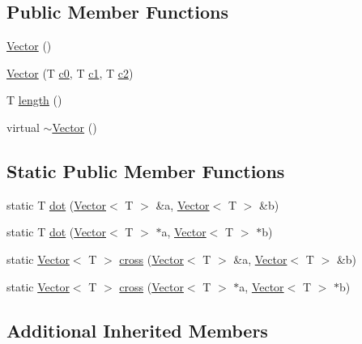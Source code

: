 \subsection*{Public Member Functions}
\begin{DoxyCompactItemize}
\item 
\hyperlink{classccmc_1_1_vector_af4225e7206c28bacb630cb396c64be26}{Vector} ()
\item 
\hyperlink{classccmc_1_1_vector_a02455eac25051ae838ad4e95e7216714}{Vector} (T \hyperlink{classccmc_1_1_point_a89fbc3792873bbc1b35d205fc0b56112}{c0}, T \hyperlink{classccmc_1_1_point_af305f62b5b3830dfb9659ba05fa8730b}{c1}, T \hyperlink{classccmc_1_1_point_aca8161451d99e44ad32f735265273db6}{c2})
\item 
T \hyperlink{classccmc_1_1_vector_a9e0862cc9c8815c93f956ccc9e23fd2f}{length} ()
\item 
virtual \hyperlink{classccmc_1_1_vector_a4ebb935d3f42494678f37eda85a06c1a}{$\sim$\-Vector} ()
\end{DoxyCompactItemize}
\subsection*{Static Public Member Functions}
\begin{DoxyCompactItemize}
\item 
static T \hyperlink{classccmc_1_1_vector_a9f03423f6c4bc0ccecc1fff2f7ca79a2}{dot} (\hyperlink{classccmc_1_1_vector}{Vector}$<$ T $>$ \&a, \hyperlink{classccmc_1_1_vector}{Vector}$<$ T $>$ \&b)
\item 
static T \hyperlink{classccmc_1_1_vector_a6071878bac8259f1794aa9109ae9431b}{dot} (\hyperlink{classccmc_1_1_vector}{Vector}$<$ T $>$ $\ast$a, \hyperlink{classccmc_1_1_vector}{Vector}$<$ T $>$ $\ast$b)
\item 
static \hyperlink{classccmc_1_1_vector}{Vector}$<$ T $>$ \hyperlink{classccmc_1_1_vector_a554c29dfc55fb81cd10ce6b0ea657dbf}{cross} (\hyperlink{classccmc_1_1_vector}{Vector}$<$ T $>$ \&a, \hyperlink{classccmc_1_1_vector}{Vector}$<$ T $>$ \&b)
\item 
static \hyperlink{classccmc_1_1_vector}{Vector}$<$ T $>$ \hyperlink{classccmc_1_1_vector_a6fe725fff4788809995acb4f76cc40b8}{cross} (\hyperlink{classccmc_1_1_vector}{Vector}$<$ T $>$ $\ast$a, \hyperlink{classccmc_1_1_vector}{Vector}$<$ T $>$ $\ast$b)
\end{DoxyCompactItemize}
\subsection*{Additional Inherited Members}


